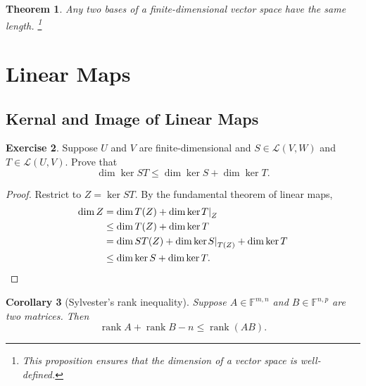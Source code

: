 \documentclass[colorlinks]{tufte-handout}
\theoremstyle{plain} %
\newtheorem{thm}{Theorem}
\newtheorem{cor}[thm]{Corollary}
\theoremstyle{definition}
\newtheorem{exer}[thm]{Exercise}
\theoremstyle{remark}
\newcommand{\bra}[1]{\mathopen{}\left(#1\right)}
\newcommand{\rest}[2]{\mathopen{}\left.#1\right|_{#2}}
\newcommand{\F}{\mathbb{F}}
\renewcommand{\L}{\mathcal{L}}
\DeclareMathOperator{\rank}{rank}
\begin{document}
\begin{thm}
	Any two bases of a finite-dimensional vector space have the same length.%
	\footnote{This proposition ensures that the \emph{dimension} of a vector space is well-defined.}
\end{thm}


\section{Linear Maps}
\subsection{Kernal and Image of Linear Maps}
\begin{exer}
	Suppose $U$ and $V$ are finite-dimensional and $S\in\L\bra{V,W}$ and $T\in\L\bra{U,V}$. Prove that
	\[\dim\ker ST \leq \dim\ker S + \dim\ker T.\]
\end{exer}
\begin{proof}
	Restrict to $Z=\ker ST$. By the fundamental theorem of linear maps,
	\begin{align*}
		\dim Z & = \dim T(Z) + \dim\ker \rest{T}{Z} \\
		& \leq \dim T(Z) + \dim\ker T \\
		& = \dim ST(Z) + \dim\ker \rest{S}{T(Z)} + \dim\ker T \\
		& \leq \dim\ker S + \dim\ker T.\qedhere
	\end{align*}
\end{proof}

\begin{cor}[Sylvester's rank inequality]
	Suppose $A\in\F^{m,n}$ and $B\in\F^{n,p}$ are two matrices. Then%
	\[\rank A+\rank B-n\leq\rank\bra{AB}.\]
\end{cor}
\end{document}
